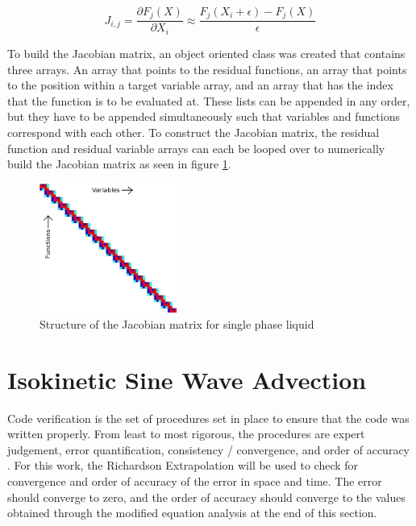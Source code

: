 \documentclass{mc2015}
\begin{document}
    \begin{equation}
    	\label{eq:jac_numerical}
    	J_{i,j}=\frac{ \partial F_{j}(X)}{\partial X_{i}}
    	      \approx \frac{F_{j}(X_{i}+\epsilon)-F_{j}(X)}{\epsilon}
    \end{equation}
    
	To build the Jacobian matrix, an object oriented class was created that
    contains three arrays. An array that points to the residual functions, an
    array that points to the position within a target variable array, and an
    array that has the index that the function is to be evaluated at. These
    lists can be appended in any order, but they have to be appended
    simultaneously such that variables and functions correspond with each
    other. To construct the Jacobian matrix, the residual function and
    residual variable arrays can each be looped over to numerically build the
    Jacobian matrix as seen in figure \ref{fig:Jacobian_Setup}. 
    
    \begin{figure}[!h]
    	\centering
    	\includegraphics[width=0.40\textwidth]{images/Jacobian_Setup}
    	\caption{Structure of the Jacobian matrix for single phase liquid}
    	\label{fig:Jacobian_Setup}
    \end{figure}

\section{Isokinetic Sine Wave Advection}

Code verification is the set of procedures set in place to ensure that the code
was written properly. From least to most rigorous, the procedures are expert
judgement, error quantification, consistency / convergence, and order of
accuracy \cite{Oberkampf2008}. For this work, the Richardson Extrapolation will be
used to check for convergence and order of accuracy of the error in space and
time. The error should converge to zero, and the order of accuracy should
converge to the values obtained through the modified equation analysis at the
end of this section.
 
\end{document}
